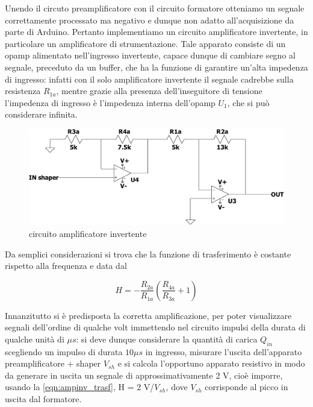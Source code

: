 \documentclass{article}
\begin{document}
Unendo il circuto preamplificatore con il circuito formatore otteniamo un segnale correttamente processato ma negativo e dunque non
adatto all'acquisizione da parte di Arduino. Pertanto implementiamo un circuito amplificatore invertente, in particolare un
amplificatore di strumentazione. Tale apparato consiste di un opamp alimentato nell'ingresso invertente, capace dunque di cambiare
segno al segnale, preceduto da un buffer, che ha la funzione di garantire un'alta impedenza di ingresso: infatti con il solo 
amplificatore invertente il segnale cadrebbe sulla resistenza $R_{1a}$, mentre grazie alla presenza dell'inseguitore di tensione 
l'impedenza di ingresso è l'impedenza interna dell'opamp $U_1$, che si può considerare infinita.

\begin{center}
    \begin{figure}[H]
    \centering
    \includegraphics[scale=0.26, angle=0]{catena.pdf}
    \caption{circuito amplificatore invertente}
    \label{fig:invertnete}
    \end{figure}
\end{center}

Da semplici considerazioni si trova che la funzione di trasferimento è costante rispetto alla frequenza e data dal

\begin{equation}
    \label{eqn:ampinv_trasf}
    H = - \frac{R_{2a}}{R_{1a}} \left( \frac{R_{4a}}{R_{3a}} + 1 \right)
\end{equation}

Innanzitutto si è predisposta la corretta amplificazione, per poter visualizzare segnali dell'ordine di qualche volt immettendo
nel circuito impulsi della durata di qualche unità di $\mu s$: si deve dunque considerare la quantità di carica $Q_{in}$ 
scegliendo un impulso di durata $10 \mu s$ in ingresso, misurare l'uscita dell'apparato preamplificatore + shaper $V_{sh}$ 
e si calcola l'opportuno apparato resistivo in modo da generare in uscita un segnale di approssimativamente 2 V, cioè imporre, usando
la \ref{eqn:ampinv_trasf}, H = 2 V/$V_{sh}$, dove $V_{sh}$ corrisponde al picco in uscita dal formatore.
\end{document}
